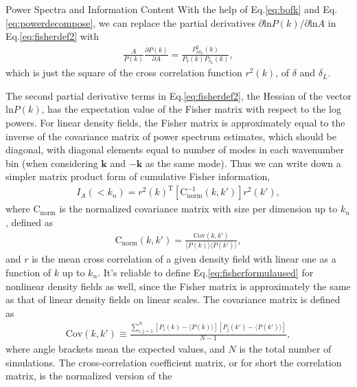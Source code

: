 \begin{section}{Power Spectra and Information Content}
  With the help of Eq.\ref{eq:bofk} and Eq.\ref{eq:powerdecompose}, we
  can replace the partial derivatives
  $\partial \mathrm{ln} P(k) / \partial \mathrm{ln} A$ in
  Eq.\ref{eq:fisherdef2} with
  \begin{align}
    \frac{A}{P(k)}\frac{\partial P(k)}{\partial A}=
    \frac{P_{\delta \delta_L}^2(k)}{P_\delta(k) P_{\delta_L}(k)},
  \end{align}
  which is just the square of the cross correlation function
  $r ^2 (k)$, of $\delta$ and $\delta_L$.

  The second partial derivative terms in Eq.\ref{eq:fisherdef2}, the
  Hessian of the vector $\mathrm{ln} P(k)$, has the expectation value
  of the Fisher matrix with respect to the log powers. For linear
  density fields, the Fisher matrix is approximately equal to the
  inverse of the covariance matrix of power spectrum estimates, which
  should be diagonal, with diagonal elements equal to number of modes
  in each wavenumber bin (when considering $\bm{k}$ and $-\bm{k}$ as
  the same mode).  Thus we can write down a simpler matrix product
  form of cumulative Fisher information,
  \begin{align}
    I_A \left( < k_n\right) = r^2(k)^{\mathrm{T}} \left[ \mathrm{C^{-1}_{norm}} 
    ( k,k' )\right] r^2(k') ,
    \label{eq:fisherformulaused}
  \end{align}
  where $\mathrm{C_{norm}}$ is the normalized covariance matrix with
  size per dimension up to $k_n$, defined as
  \begin{align}
    \mathrm{C_{norm}} \left( k,k' \right)=\frac{\mathrm{Cov}(k,k')}
    {\langle P(k)\rangle\langle P(k')\rangle},
  \end{align}
  and $r$ is the mean cross correlation of a given density field with
  linear one as a function of $k$ up to $k_n$.  It's reliable to
  define Eq.\ref{eq:fisherformulaused} for nonlinear density fields as
  well, since the Fisher matrix is approximately the same as that of
  linear density fields on linear scales.  The covariance matrix is
  defined as
  \begin{align}
    \mathrm{Cov}\left(k,k'\right)\equiv \frac{\sum_{i,j=1}^{N}\left[ P_i \left( k \right) - 
    \langle P \left( k \right) \rangle \right]\left[ P_j \left( k' \right) - 
    \langle P \left( k' \right)\rangle \right]}{N-1},
  \end{align}
  where angle brackets mean the expected values, and $N$ is the total
  number of simulations.  The cross-correlation coefficient matrix, or
  for short the correlation matrix, is the normalized version of the

\end{section}
